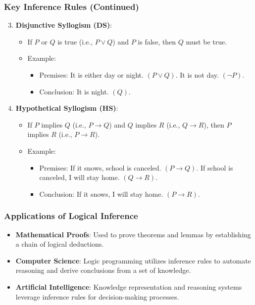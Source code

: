\documentclass[aspectratio=169]{beamer}
\begin{document}
\begin{frame}[fragile]
    \frametitle{Key Inference Rules (Continued)}
    \begin{enumerate}
        \setcounter{enumi}{2}
        \item \textbf{Disjunctive Syllogism (DS)}:
              \begin{itemize}
                  \item If \( P \) or \( Q \) is true (i.e., \( P \lor Q \)) and \( P \) is false, then \( Q \) must be true.
                  \item Example:
                  \begin{itemize}
                      \item Premises: It is either day or night. \( (P \lor Q) \). It is not day. \( (\neg P) \).
                      \item Conclusion: It is night. \( (Q) \).
                  \end{itemize}
              \end{itemize}

        \item \textbf{Hypothetical Syllogism (HS)}:
              \begin{itemize}
                  \item If \( P \) implies \( Q \) (i.e., \( P \rightarrow Q \)) and \( Q \) implies \( R \) (i.e., \( Q \rightarrow R \)), then \( P \) implies \( R \) (i.e., \( P \rightarrow R \)).
                  \item Example:
                  \begin{itemize}
                      \item Premises: If it snows, school is canceled. \( (P \rightarrow Q) \). If school is canceled, I will stay home. \( (Q \rightarrow R) \).
                      \item Conclusion: If it snows, I will stay home. \( (P \rightarrow R) \).
                  \end{itemize}
              \end{itemize}
    \end{enumerate}
\end{frame}

\begin{frame}[fragile]
    \frametitle{Applications of Logical Inference}
    \begin{itemize}
        \item \textbf{Mathematical Proofs}: Used to prove theorems and lemmas by establishing a chain of logical deductions.
        \item \textbf{Computer Science}: Logic programming utilizes inference rules to automate reasoning and derive conclusions from a set of knowledge.
        \item \textbf{Artificial Intelligence}: Knowledge representation and reasoning systems leverage inference rules for decision-making processes.
    \end{itemize}
\end{frame}
\end{document}
